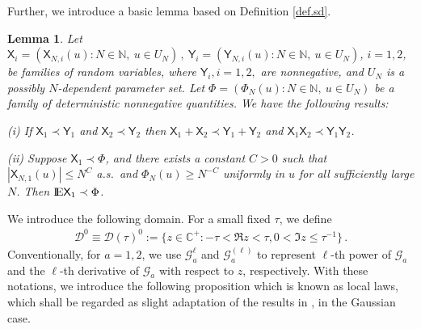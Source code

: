 \documentclass[12pt]{article}
\numberwithin{equation}{section}
\newtheorem{lem}{Lemma}
\theoremstyle{remark}
\newcommand{\1}{{\rm 1}\kern-0.24em{\rm I}}
\newcommand{\E}{{\rm I}\kern-0.18em{\rm E}}
\begin{document}
Further, we introduce a basic lemma based on Definition \ref{def.sd}.
\begin{lem} \label{prop_prec} Let $  \mathsf{X}_i=(\mathsf{X}_{N,i}(u):  N \in \mathbb{N}, \ u \in {U}_{N})\,, \   \mathsf{Y}_i=(\mathsf{Y}_{N,i}(u):  N \in \mathbb{N}, \ u \in {U}_{N})$,  $i=1,2$,
	be families of  random variables, where $\mathsf{Y}_i, i=1,2,$ are nonnegative, and ${U}_{N}$ is a possibly $N$-dependent parameter set.	Let 
$
	\Phi=(\Phi_{N}(u): N \in \mathbb{N}, \ u \in {U}_{N})
$
	be a family of deterministic nonnegative quantities. We have the following results:
	
(i)	If $\mathsf{X}_1 \prec \mathsf{Y}_1$ and $\mathsf{X}_2 \prec \mathsf{Y}_2$ then $\mathsf{X}_1+\mathsf{X}_2 \prec \mathsf{Y}_1+\mathsf{Y}_2$ and  $\mathsf{X}_1\mathsf{X}_2 \prec \mathsf{Y}_1 \mathsf{Y}_2$.

	
 (ii) Suppose $\mathsf{X}_1 \prec \Phi$, and there exists a constant $C>0$ such that  $|\mathsf{X}_{N,1}(u)| \leq N^C$ a.s.\ and $\Phi_{N}(u)\geq N^{-C}$ uniformly in $u$ for all sufficiently large $N$. Then $\E \mathsf{X}_1 \prec \Phi$.
\end{lem}



We introduce the following domain. For a small fixed $\tau$, we define 
\begin{align}\label{19071810*}
\mathcal{D}^0\equiv\mathcal{D}(\tau)^0:= \{ z\in \mathbb{C}^+:-\tau< \Re{z} <  \tau, 0< \Im{z}\leq \tau^{-1}\}\,.
\end{align}
Conventionally, for $a=1,2$, we use $\mathcal{G}_a^{\ell}$ and $\mathcal{G}_a^{(\ell)}$ to represent $\ell$-th power of $\mathcal{G}_a$ and the $\ell$-th derivative of $\mathcal{G}_a$ with respect to $z$, respectively.  
 With these notations, we introduce the following proposition which is known as local laws, which shall be regarded as slight adaptation of the results in \cite{bloemendal2014isotropic}, in the Gaussian case.
\end{document}
